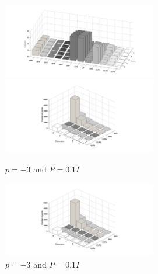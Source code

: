 \documentclass[letterpaper, 10 pt, conference]{ieeeconf}  %
\begin{document}
  \begin{figure}[thpb]
  \centering
      \includegraphics[width=0.6\textwidth]{pmin3P01}
     \includegraphics[width=0.6\textwidth]{numberofpointspmin3P01}
      \caption{$p=-3$ and $P=0.1I$}
      \label{fig:polartocart4}
   \end{figure} 
     \begin{figure}[thpb]
      \includegraphics[width=0.6\textwidth]{numberofpointspmin3P01}
      \caption{$p=-3$ and $P=0.1I$}
      \label{fig:polartocart4}
   \end{figure} 


\addtolength{\textheight}{-3cm}   %


\end{document}
